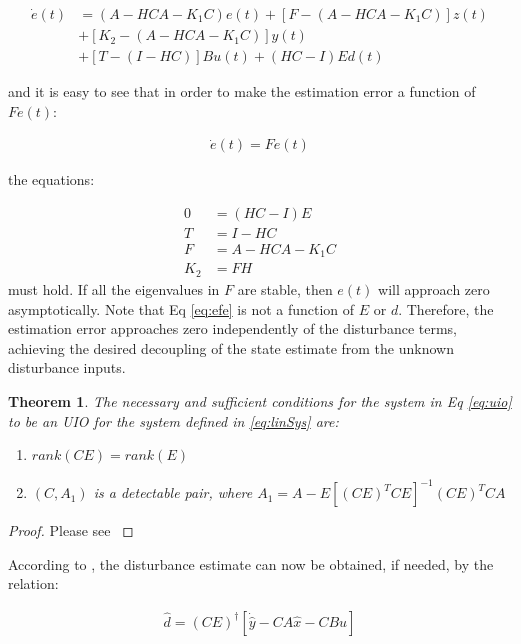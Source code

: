 \documentclass{amsart}
\newtheorem{theorem}{Theorem}[section]
\theoremstyle{definition}
\theoremstyle{remark}
\numberwithin{equation}{section}
\begin{document}
\begin{align*}
\dot{e}(t) &= (A-HCA-K_1 C)e(t) + \left [ F-(A-HCA-K_1 C) \right ]z(t) \\
&+[K_2 - (A-HCA-K_1 C)]y(t) \\
&+ [T-(I-HC)]Bu(t) + (HC-I)Ed(t)
\end{align*}

and it is easy to see that in order to make the estimation error a function of $Fe(t)$:

\begin{align}
\dot{e}(t) = Fe(t) \label{eq:efe}
\end{align}



the equations:

\begin{align}
0       &= (HC-I)E \label{eq:HCIE}\\
T       &= I - HC \\
F       &= A-HCA-K_1 C \label{eq:F}\\
K_2     &= FH
\end{align}
must hold. If all the eigenvalues in $F$ are stable, then $e(t)$ will approach zero asymptotically.  Note that Eq \ref{eq:efe} is not a function of $E$ or $d$.  Therefore, the estimation error approaches zero independently of the disturbance terms, achieving the desired decoupling of the state estimate from the unknown disturbance inputs.

\begin{theorem}The necessary and sufficient conditions for the system in Eq \ref{eq:uio} to be an UIO for the system defined in \ref{eq:linSys} are:
\begin{enumerate}
    \item $rank(CE)=rank(E)$
    \item $(C,A_1)$ is a detectable pair, where $A_1 = A-E[(CE)^T CE]^{-1} (CE)^T CA$
\end{enumerate}
\end{theorem}

\begin{proof}
Please see \cite{Chen99}
\end{proof}
According to \cite{Shaf2015}, the disturbance estimate can now be obtained, if needed, by the relation:

\begin{equation}
\begin{aligned}
\hat{d} = (CE)^{\dagger}[\dot{\hat{y}}-CA\hat{x}-CBu]
\end{aligned}
\end{equation}
\end{document}
